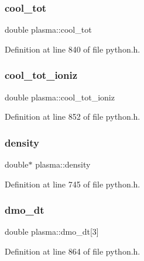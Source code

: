 \subsubsection{\texorpdfstring{cool\+\_\+tot}{cool\_tot}}
{\footnotesize\ttfamily double plasma\+::cool\+\_\+tot}



Definition at line 840 of file python.\+h.

\mbox{\label{structplasma_ae0379496a0c22546580980cccfabf0c2}} 
\subsubsection{\texorpdfstring{cool\+\_\+tot\+\_\+ioniz}{cool\_tot\_ioniz}}
{\footnotesize\ttfamily double plasma\+::cool\+\_\+tot\+\_\+ioniz}



Definition at line 852 of file python.\+h.

\mbox{\label{structplasma_a711ac1ddc0f32849edd96d937ff70761}} 
\subsubsection{\texorpdfstring{density}{density}}
{\footnotesize\ttfamily double$\ast$ plasma\+::density}



Definition at line 745 of file python.\+h.

\mbox{\label{structplasma_a3447796c585931795cefa93400544b15}} 
\subsubsection{\texorpdfstring{dmo\+\_\+dt}{dmo\_dt}}
{\footnotesize\ttfamily double plasma\+::dmo\+\_\+dt\mbox{[}3\mbox{]}}



Definition at line 864 of file python.\+h.

\mbox{\label{structplasma_a174c204665ec6522d9c1dad57408b577}} 
